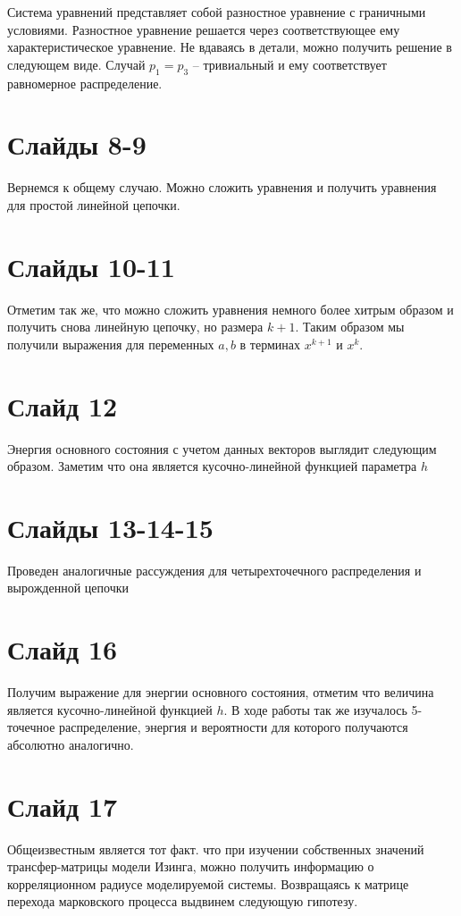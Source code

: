 \documentclass[a4paper]{article}
\begin{document}
Система уравнений представляет собой разностное уравнение с граничными условиями. Разностное уравнение решается через соответствующее ему характеристическое уравнение. Не вдаваясь в детали, можно получить решение в следующем виде. Случай $p_1 = p_3$ -- тривиальный и ему соответствует равномерное распределение.

\section*{Слайды 8-9}
Вернемся к общему случаю. Можно сложить уравнения и получить уравнения для простой линейной цепочки.

\section*{Слайды 10-11}
Отметим так же, что можно сложить уравнения немного более хитрым образом и получить снова линейную цепочку, но размера $k+1$.
Таким образом мы получили выражения для переменных $a,b$ в терминах $x^{k+1}$ и $x^k$.

\section*{Слайд 12}
Энергия основного состояния с учетом данных векторов выглядит следующим образом. Заметим что она является кусочно-линейной функцией параметра $h$
\section*{Слайды 13-14-15}
Проведен аналогичные рассуждения для четырехточечного распределения и вырожденной цепочки
\section*{Слайд 16}
Получим выражение для энергии основного состояния, отметим что величина является кусочно-линейной функцией $h$. В ходе работы так же изучалось 5-точечное распределение, энергия и вероятности для которого получаются абсолютно аналогично.

\section*{Слайд 17}
Общеизвестным является тот факт. что при изучении собственных значений трансфер-матрицы модели Изинга, можно получить информацию о корреляционном радиусе моделируемой системы.
Возвращаясь к матрице перехода марковского процесса выдвинем следующую гипотезу.
\end{document}
